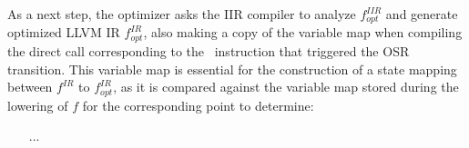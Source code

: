 As a next step, the optimizer asks the IIR compiler to analyze $f^{IIR}_{opt}$ and generate optimized LLVM IR $f^{IR}_{opt}$, also making a copy of the variable map when compiling the direct call corresponding to the \feval\ instruction that triggered the OSR transition. This variable map is essential for the construction of a state mapping between $f^{IR}$ to $f^{IR}_{opt}$, as it is compared against the variable map stored during the lowering of $f$ for the corresponding point to determine:
\begin{itemize}
\item [...]
\end{itemize}

  
  
  
  
  
  
  
  
  
  
  
  
  
  
  